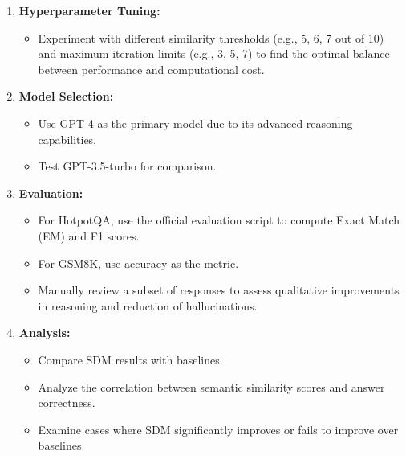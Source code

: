 \begin{tcolorbox}[colback=blue!5!white,colframe=blue!75!black,title=\textbf{Semantic Divergence Minimization: Reducing Hallucinations in Large Language Models
through Iterative Concept Grounding (Part 2)}]
{\begin{enumerate}
    \begin{itemize}
        \item Design prompts for each step of SDM. For example:
        \begin{itemize}
            \item "Generate the next step in solving this problem:"
            \item "Extract key concepts from the original question:"
            \item "Rate the semantic similarity between these concepts and the generated step on a scale of 0-10:"
            \item "Regenerate the step, focusing more on these key concepts:"
        \end{itemize}
    \end{itemize}
    \item \textbf{Hyperparameter Tuning:}
    \begin{itemize}
        \item Experiment with different similarity thresholds (e.g., 5, 6, 7 out of 10) and maximum iteration limits (e.g., 3, 5, 7) to find the optimal balance between performance and computational cost.
    \end{itemize}
    \item \textbf{Model Selection:}
    \begin{itemize}
        \item Use GPT-4 as the primary model due to its advanced reasoning capabilities.
        \item Test GPT-3.5-turbo for comparison.
    \end{itemize}
    \item \textbf{Evaluation:}
    \begin{itemize}
        \item For HotpotQA, use the official evaluation script to compute Exact Match (EM) and F1 scores.
        \item For GSM8K, use accuracy as the metric.
        \item Manually review a subset of responses to assess qualitative improvements in reasoning and reduction of hallucinations.
    \end{itemize}
    \item \textbf{Analysis:}
    \begin{itemize}
        \item Compare SDM results with baselines.
        \item Analyze the correlation between semantic similarity scores and answer correctness.
        \item Examine cases where SDM significantly improves or fails to improve over baselines.
    \end{itemize}
\end{enumerate}
}
\end{tcolorbox}

